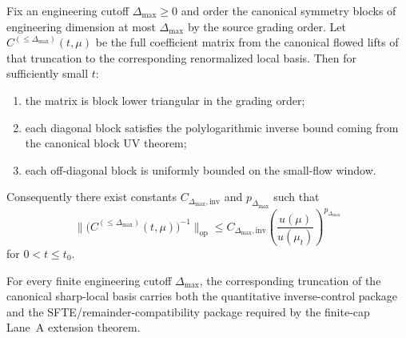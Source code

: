 \begin{theorem}
Fix an engineering cutoff $\Delta_{\max}\ge 0$ and order the canonical symmetry blocks of engineering dimension at most $\Delta_{\max}$ by the source grading order. Let $C^{(\le \Delta_{\max})}(t,\mu)$ be the full coefficient matrix from the canonical flowed lifts of that truncation to the corresponding renormalized local basis. Then for sufficiently small $t$:
\begin{enumerate}[label=(\roman*),leftmargin=2.2em]
\item the matrix is block lower triangular in the grading order;
\item each diagonal block satisfies the polylogarithmic inverse bound coming from the canonical block UV theorem;
\item each off-diagonal block is uniformly bounded on the small-flow window.
\end{enumerate}
Consequently there exist constants $C_{\Delta_{\max},\mathrm{inv}}$ and $p_{\Delta_{\max}}$ such that
\[
\bigl\|\bigl(C^{(\le \Delta_{\max})}(t,\mu)\bigr)^{-1}\bigr\|_{\mathrm{op}}
\le C_{\Delta_{\max},\mathrm{inv}}\left(\frac{u(\mu)}{u(\mu_t)}\right)^{p_{\Delta_{\max}}}
\]
for $0<t\le t_0$.
\end{theorem}

\begin{corollary}
For every finite engineering cutoff $\Delta_{\max}$, the corresponding truncation of the canonical sharp-local basis carries both the quantitative inverse-control package and the SFTE/remainder-compatibility package required by the finite-cap Lane~A extension theorem.
\end{corollary}


